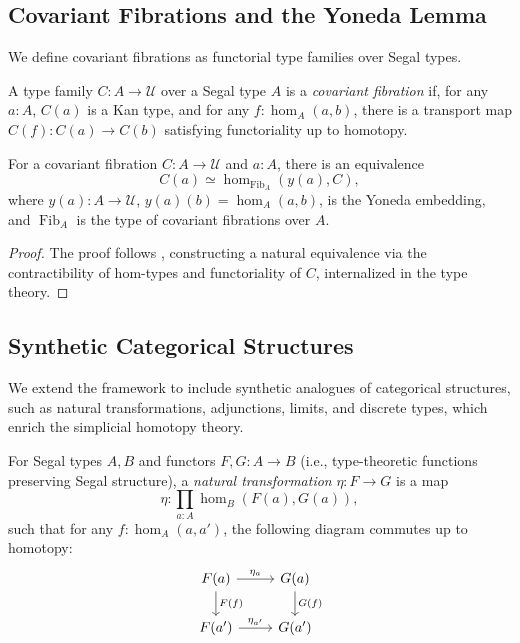\documentclass{article}
\begin{document}
\newpage
\subsection{Covariant Fibrations and the Yoneda Lemma}

We define covariant fibrations as functorial type families over Segal types.

\begin{definition}
A type family $C : A \to \mathcal{U}$ over a Segal type $A$ is a \emph{covariant fibration} if, for any $a : A$, $C(a)$ is a Kan type, and for any $f : \operatorname{hom}_A(a,b)$, there is a transport map $C(f) : C(a) \to C(b)$ satisfying functoriality up to homotopy.
\end{definition}

\begin{theorem}
For a covariant fibration $C : A \to \mathcal{U}$ and $a : A$, there is an equivalence
\[
C(a) \simeq \operatorname{hom}_{\operatorname{Fib}_A}(y(a), C),
\]
where $y(a) : A \to \mathcal{U}$, $y(a)(b) = \operatorname{hom}_A(a,b)$, is the Yoneda embedding, and $\operatorname{Fib}_A$ is the type of covariant fibrations over $A$.
\end{theorem}
\begin{proof}
The proof follows \cite{Shu15}, constructing a natural equivalence via the contractibility of hom-types and functoriality of $C$, internalized in the type theory.
\end{proof}


\subsection{Synthetic Categorical Structures}

We extend the framework to include synthetic analogues of categorical structures, such as natural transformations, adjunctions, limits, and discrete types, which enrich the simplicial homotopy theory.

\begin{definition}
For Segal types $A, B$ and functors $F, G : A \to B$ (i.e., type-theoretic functions preserving Segal structure), a \emph{natural transformation} $\eta : F \to G$ is a map
\[
\eta : \prod_{a : A} \operatorname{hom}_B(F(a), G(a)),
\]
such that for any $f : \operatorname{hom}_A(a, a')$, the following diagram commutes up to homotopy:
\[
\begin{tikzcd}
F(a) \arrow[r, "\eta_a"] \arrow[d, "F(f)"] & G(a) \arrow[d, "G(f)"] \\
F(a') \arrow[r, "\eta_{a'}"] & G(a')
\end{tikzcd}
\]
\end{definition}
\end{document}

